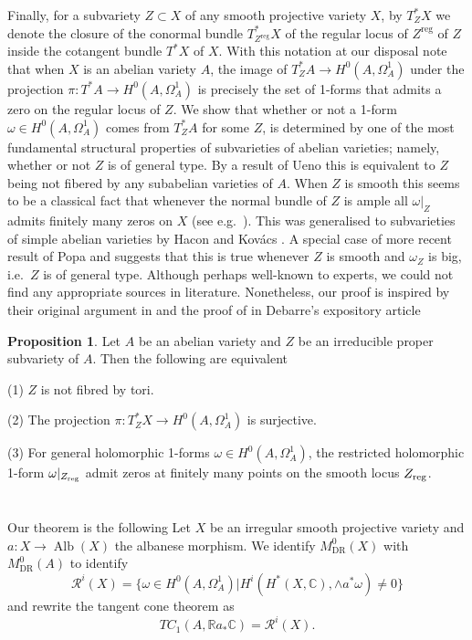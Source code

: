 \documentclass[a4paper,12pt,reqno]{amsart}
\theoremstyle{plain}
\theoremstyle{definition}
\newtheorem{proposition}[theorem]{Proposition}
\theoremstyle{remark}
\def\bp{\begin{proposition}}
\def\ep{\end{proposition}}
\DeclareMathOperator{\reg}{reg}                  %
\DeclareMathOperator{\Alb}{Alb}
\newcommand{\sR}{\mathcal{R}}
\newcommand{\bbC}{\mathbb{C}}
\newcommand{\bbR}{\mathbb{R}}
\DeclareMathOperator{\DR}{DR}
\begin{document}
Finally, for a subvariety $Z\subset X$ of any smooth projective variety $X$, by 
$T^*_ZX$ we denote the closure of the conormal bundle $T^*_{Z^{\reg}}X$ of the regular locus of $Z^{\reg}$ of $Z$
inside the cotangent bundle $T^*X$ of $X$. With this notation at our disposal note that when $X$ is an abelian variety
$A$, the image of $T^*_ZA\to H^0(A,\Omega_A^1)$ under the projection $\pi\colon T^*A \to H^0(A,\Omega_A^1)$ is precisely the set of 1-forms that admits a zero on the regular locus of $Z$.
We show that whether or not a 1-form $\omega\in H^0(A,\Omega_A^1)$
comes from $T^*_ZA$ for some $Z$, is determined by one of the most fundamental
 structural properties of subvarieties of abelian varieties;
 namely, whether or not
$Z$ is of general type. By a result of Ueno \cite[Theorem 10.9]{Uen75} this is equivalent to $Z$ being not fibered by any subabelian varieties of $A$. 
When $Z$ is smooth 
this seems to be a classical fact that whenever the normal bundle of $Z$ is ample all $\omega|_Z$ admits finitely many zeros on $X$
(see e.g.\ \cite[Lemma 3.1]{Deb}). This was generalised to subvarieties of simple abelian varieties by 
Hacon and Kov\'acs \cite[Proposition 3.1]{HK05}. A special case of more recent result of Popa and \cite{PS14} suggests that this is true whenever $Z$ is smooth and
$\omega_Z$ is big,
i.e.\ $Z$ is of general type. Although perhaps well-known to experts, we could not find any appropriate sources in literature. Nonetheless, our proof is inspired
by their original argument in\cite[Proposition 3.1]{HK05} and the proof of \cite[Lemma 3.1]{Deb} in Debarre's expository article

\bp\label{van-nonsimple}
Let $A$ be an abelian variety and $Z$ be an irreducible proper subvariety of $A$. Then the following are equivalent

(1) $Z$ is not fibred by tori. 

(2) The projection $\pi\colon T^*_ZX\to H^0(A, \Omega_A^1)$ is surjective.

(3) For general holomorphic 1-forms $\omega\in H^0(A, \Omega_A^1)$, the restricted holomorphic 1-form $\omega|_{Z_{\textnormal{reg}}}$ admit zeros at finitely many points on the smooth locus $Z_{\textnormal{reg}}$.
\ep



\section{}
Our theorem is the following
Let $X$ be an irregular smooth projective variety and $a\colon X\to \Alb(X)$ the albanese morphism. We identify $M_{\DR}^0(X)$ with $M_{\DR}^0(A)$ 
to identify
\[\sR^i(X) = \{\omega\in H^0(A, \Omega_A^1)| H^i(H^*(X, \bbC), \wedge a^*\omega)\neq 0\}\]
and rewrite the tangent cone theorem as 
\[TC_1(A, \bbR a_*\bbC) = \sR^i(X).\]
\end{document}
